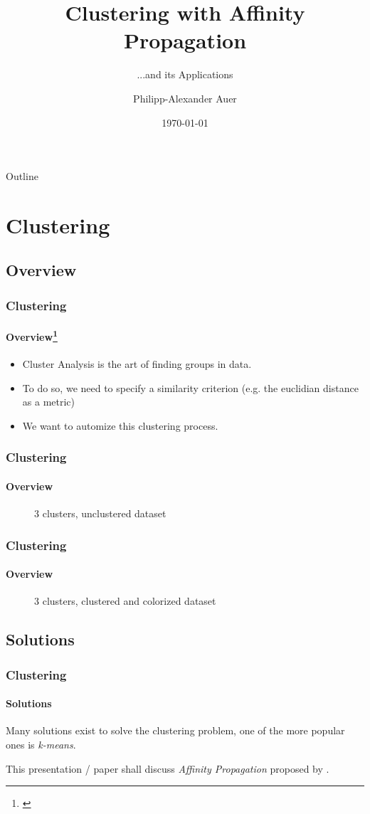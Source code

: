 \documentclass{beamer}
\title[Affinity Propagation]{%
  Clustering with Affinity Propagation
}
\subtitle{...and its Applications}
\author{Philipp-Alexander Auer}
\date{\today}
\begin{document}
\begin{frame}
  \titlepage
\end{frame}

\begin{frame}{Outline}
  \tableofcontents
\end{frame}

\section{Clustering}

\subsection[Overview]{Overview}
\begin{frame}[fragile]
  \frametitle{Clustering}
  \framesubtitle{Overview\footnote{\cite{kaufman2009finding}}}
  \begin{itemize}
  	\item Cluster Analysis is the art of finding groups in data. 
  	\item To do so, we need to specify a similarity criterion (e.g. the euclidian distance as a metric)
  	\item We want to automize this clustering process.
  	
  \end{itemize}
\end{frame}
\begin{frame}[fragile]
\frametitle{Clustering}
\framesubtitle{Overview}
\begin{figure}
	\centering
	\scalebox{0.7}{
		
	}
	\caption{3 clusters, unclustered dataset}
	\label{fig:unclust}
\end{figure}
\end{frame}

\begin{frame}[fragile]
\frametitle{Clustering}
\framesubtitle{Overview}
\begin{figure}
	\centering
	\scalebox{0.7}{
		
	}
	\caption{3 clusters, clustered and colorized dataset}
	\label{fig:clust}
\end{figure}
\end{frame}

\subsection[classical]{Solutions}
\begin{frame}
  \frametitle{Clustering}
  \framesubtitle{Solutions}
  Many solutions exist to solve the clustering problem, one of the more popular ones is \emph{k-means}. \cite{frey2007clustering}
  
  This presentation / paper shall discuss \emph{Affinity Propagation} proposed by \cite{frey2007clustering}. 
\end{frame}
\end{document}
